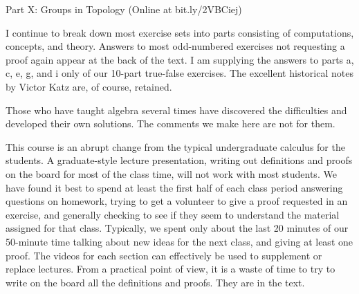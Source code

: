 \documentclass[11pt,oneside]{article}
\begin{document}
\begin{BookBody}






\noindent Part X: Groups in Topology (Online at bit.ly/2VBCiej)



\noindent I continue to break down most exercise sets into parts consisting of computations, concepts, and theory. Answers to most odd-numbered exercises not requesting a proof again appear at the back of the text. I am supplying the answers to parts a, c, e, g, and i only of our 10-part true-false exercises. The excellent historical notes by Victor Katz are, of course, retained.


\noindent Those who have taught algebra several times have discovered the difficulties and developed their own solutions. The comments we make here are not for them.

This course is an abrupt change from the typical undergraduate calculus for the students. A graduate-style lecture presentation, writing out definitions and proofs on the board for most of the class time, will not work with most students. We have found it best to spend at least the first half of each class period answering questions on homework, trying to get a volunteer to give a proof requested in an exercise, and generally checking to see if they seem to understand the material assigned for that class. Typically, we spent only about the last 20 minutes of our 50-minute time talking about new ideas for the next class, and giving at least one proof. The videos for each section can effectively be used to supplement or replace lectures. From a practical point of view, it is a waste of time to try to write on the board all the definitions and proofs. They are in the text.


\end{BookBody}
\end{document}
